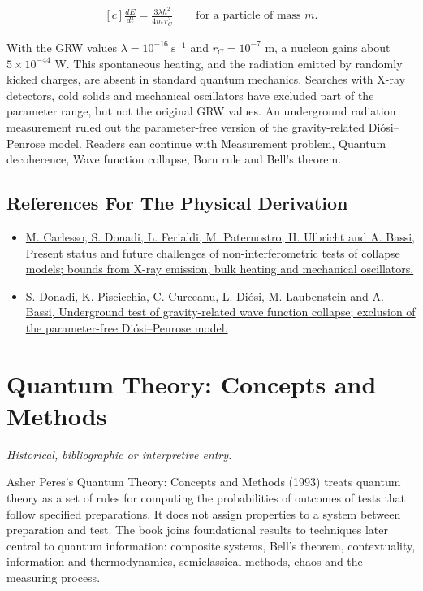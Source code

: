 \documentclass[11pt,oneside]{book}
\newenvironment{centeredalign}{\[\begin{gathered}[c]}{\end{gathered}\]}
\begin{document}
\begin{centeredalign}
\frac{dE}{dt}=\frac{3\lambda\hbar^2}{4m\,r_C^2}\qquad\text{for a particle of mass } m .
\end{centeredalign}

With the GRW values \(\lambda=10^{-16}\ \mathrm{s^{-1}}\) and \(r_C=10^{-7}\) m, a nucleon gains about \(5\times10^{-44}\) W. This spontaneous heating, and the radiation emitted by randomly kicked charges, are absent in standard quantum mechanics. Searches with X-ray detectors, cold solids and mechanical oscillators have excluded part of the parameter range, but not the original GRW values. An underground radiation measurement ruled out the parameter-free version of the gravity-related Diósi--Penrose model. Readers can continue with Measurement problem, Quantum decoherence, Wave function collapse, Born rule and Bell's theorem.

\subsection*{References For The Physical Derivation}
\begin{itemize}
\item \href{https://arxiv.org/abs/2203.04231}{M. Carlesso, S. Donadi, L. Ferialdi, M. Paternostro, H. Ulbricht and A. Bassi, Present status and future challenges of non-interferometric tests of collapse models; bounds from X-ray emission, bulk heating and mechanical oscillators.}
\item \href{https://arxiv.org/abs/2111.13490}{S. Donadi, K. Piscicchia, C. Curceanu, L. Diósi, M. Laubenstein and A. Bassi, Underground test of gravity-related wave function collapse; exclusion of the parameter-free Diósi--Penrose model.}
\end{itemize}





\clearpage

\section{Quantum Theory: Concepts and Methods}

\label{topic:quantum-theory-concepts-and-methods}

\par\smallskip\noindent\textit{Historical, bibliographic or interpretive entry.}

Asher Peres's Quantum Theory: Concepts and Methods (1993) treats quantum theory as a set of rules for computing the probabilities of outcomes of tests that follow specified preparations. It does not assign properties to a system between preparation and test. The book joins foundational results to techniques later central to quantum information: composite systems, Bell's theorem, contextuality, information and thermodynamics, semiclassical methods, chaos and the measuring process.
\end{document}
